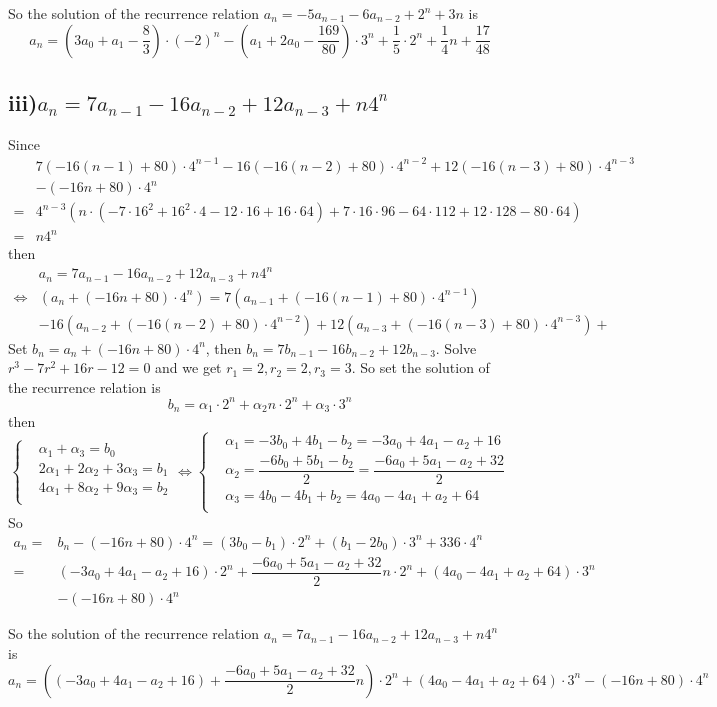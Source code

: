 \documentclass[a4paper,12pt,titlepage]{article}
\begin{document}
So the solution of the recurrence relation $a_n=-5a_{n-1}-6a_{n-2}+2^n+3n$ is
$$a_n=(3a_0+a_1-\dfrac{8}{3})\cdot (-2)^n-(a_1+2a_0-\dfrac{169}{80})\cdot3^n+\dfrac{1}{5}\cdot 2^{n}+\dfrac{1}{4}n+\dfrac{17}{48}$$

\subsection*{iii)$a_n=7a_{n-1}-16a_{n-2}+12a_{n-3}+n 4^n$}
Since 
\begin{align*}
&7(-16(n-1)+80)\cdot4^{n-1}-16(-16(n-2)+80)\cdot4^{n-2}+12(-16(n-3)+80)\cdot4^{n-3}\\&-(-16n+80)\cdot4^{n}\\
=&4^{n-3}(n\cdot(-7\cdot16^2+16^2\cdot4-12\cdot16+16\cdot64)+
7\cdot16\cdot96-64\cdot112+12\cdot128-80\cdot64)\\
=&n4^n
\end{align*}
then
\begin{align*}
&a_n=7a_{n-1}-16a_{n-2}+12a_{n-3}+n 4^n\\
\Leftrightarrow& (a_n+(-16n+80)\cdot4^{n})=7(a_{n-1}+(-16(n-1)+80)\cdot4^{n-1})\\&-16(a_{n-2}+(-16(n-2)+80)\cdot4^{n-2})+12(a_{n-3}+(-16(n-3)+80)\cdot4^{n-3})
+\end{align*} 
Set $b_n=a_n+(-16n+80)\cdot4^{n}$, then $b_n=7b_{n-1}-16b_{n-2}+12b_{n-3}$. Solve $r^3-7r^2+16r-12=0$ and we get $r_1=2,r_2=2,r_3=3$. So set the solution of the recurrence relation is
$$b_n=\alpha_1 \cdot 2^n+\alpha_2n\cdot2^n+\alpha_3\cdot3^n$$
then
$$\left\{
\begin{aligned}
&\alpha_1+\alpha_3=b_0\\
&2\alpha_1+2\alpha_2+3\alpha_3=b_1\\
&4\alpha_1+8\alpha_2+9\alpha_3=b_2\\
\end{aligned}
\right.\Leftrightarrow \left\{
\begin{aligned}
&\alpha_1=-3b_0+4b_1-b_2=-3a_0+4a_1-a_2+16\\
&\alpha_2=\dfrac{-6b_0+5b_1-b_2}{2}=\dfrac{-6a_0+5a_1-a_2+32}{2}\\
&\alpha_3=4b_0-4b_1+b_2=4a_0-4a_1+a_2+64\\
\end{aligned}
\right. $$	
So 
\begin{align*}
a_n=&b_n-(-16n+80)\cdot4^{n}=(3b_0-b_1)\cdot 2^n+(b_1-2b_0)\cdot3^n+336\cdot 4^n\\
=&(-3a_0+4a_1-a_2+16)\cdot 2^n+\dfrac{-6a_0+5a_1-a_2+32}{2}n\cdot 2^n+(4a_0-4a_1+a_2+64)\cdot3^n\\&-(-16n+80)\cdot4^{n}
\end{align*}

So the solution of the recurrence relation $a_n=7a_{n-1}-16a_{n-2}+12a_{n-3}+n 4^n$ is
$$a_n=((-3a_0+4a_1-a_2+16)+\dfrac{-6a_0+5a_1-a_2+32}{2}n)\cdot 2^n+(4a_0-4a_1+a_2+64)\cdot3^n-(-16n+80)\cdot4^{n}$$
\end{document}
